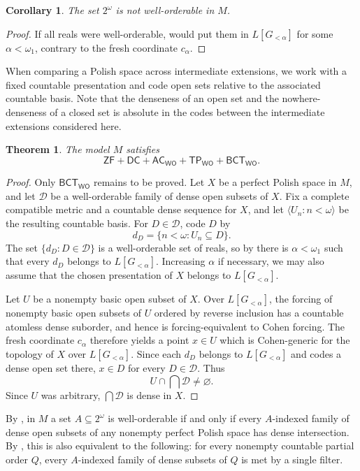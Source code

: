 \documentclass[11pt,reqno]{amsart}
\newcommand{\WO}{\mathsf{WO}}
\newcommand{\BCTWO}{\mathsf{BCT}_{\WO}}
\newcommand{\TP}{\mathsf{TP}_{\WO}}
\theoremstyle{plain}
\newtheorem{theorem}{Theorem}[section]
\newtheorem{corollary}[corollary]{Corollary}
\theoremstyle{definition}
\theoremstyle{remark}
\begin{document}
\begin{corollary}\label{cor:reals-not-wo}
The set $2^\omega$ is not well-orderable in $M$.
\end{corollary}

\begin{proof}
If all reals were well-orderable,  would put them in
$L[G_{<\alpha}]$ for some $\alpha<\omega_1$, contrary to the fresh
coordinate $c_\alpha$.
\end{proof}
When comparing a Polish space across intermediate extensions, we work with a fixed countable presentation and code open sets relative to the associated countable basis.
Note that the denseness of an open set and the nowhere-denseness of a closed set is absolute in the codes between the intermediate extensions considered here.

\begin{theorem}\label{thm:model-principles}
The model $M$ satisfies
\[
\mathsf{ZF}+\mathsf{DC}+\mathsf{AC}_{\WO}+\TP+\BCTWO.
\]
\end{theorem}

\begin{proof}
Only $\BCTWO$ remains to be proved.
Let $X$ be a perfect Polish space in $M$, and let $\mathcal D$ be a well-orderable family of dense open subsets of $X$.
Fix a complete compatible metric and a countable dense sequence for $X$, and let $\langle U_n:n<\omega\rangle$ be the resulting countable basis.
For $D\in\mathcal D$, code $D$ by
\[
d_D=\{n<\omega:U_n\subseteq D\}.
\]
The set $\{d_D:D\in\mathcal D\}$ is a well-orderable set of reals, so by  there is $\alpha<\omega_1$ such that every $d_D$ belongs to $L[G_{<\alpha}]$.
Increasing $\alpha$ if necessary, we may also assume that the chosen presentation of $X$ belongs to $L[G_{<\alpha}]$.

Let $U$ be a nonempty basic open subset of $X$.
Over $L[G_{<\alpha}]$, the forcing of nonempty basic open subsets of $U$ ordered by reverse inclusion has a countable atomless dense suborder, and hence is forcing-equivalent to Cohen forcing.
The fresh coordinate $c_\alpha$ therefore yields a point $x\in U$ which is Cohen-generic for the topology of $X$ over $L[G_{<\alpha}]$.
Since each $d_D$ belongs to $L[G_{<\alpha}]$ and codes a dense open set there, $x\in D$ for every $D\in\mathcal D$.
Thus
\[
U\cap\bigcap\mathcal D\neq\varnothing.
\]
Since $U$ was arbitrary, $\bigcap\mathcal D$ is dense in $X$.
\end{proof}

By , in $M$ a set $A\subseteq2^\omega$ is well-orderable if and only if every $A$-indexed family of dense open subsets of any nonempty perfect Polish space has dense intersection.
By , this is also equivalent to the following: for every nonempty countable partial order $Q$, every $A$-indexed family of dense subsets of $Q$ is met by a single filter.
\end{document}
